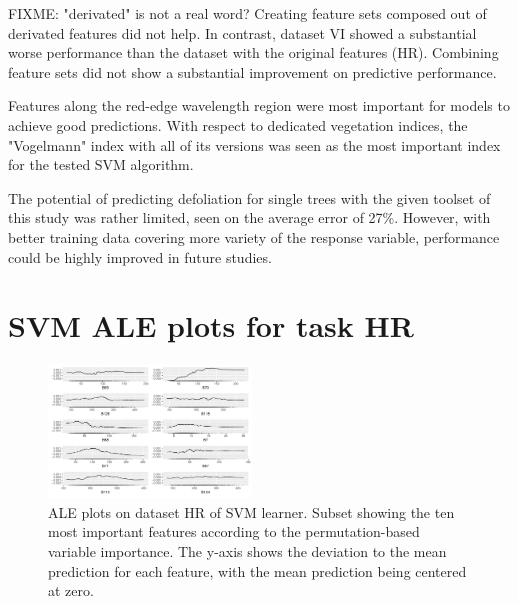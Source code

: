 \documentclass[letterpaper, peerreview]{IEEEtran}
\begin{document}
FIXME: "derivated" is not a real word?
Creating feature sets composed out of derivated features did not help.
In contrast, dataset VI showed a substantial worse performance than the dataset with the original features (HR).
Combining feature sets did not show a substantial improvement on predictive performance.

Features along the red-edge wavelength region were most important for models to achieve good predictions.
With respect to dedicated vegetation indices, the "Vogelmann" index with all of its versions was seen as the most important index for the tested SVM algorithm.

The potential of predicting defoliation for single trees with the given toolset of this study was rather limited, seen on the average error of 27\%. 
However, with better training data covering more variety of the response variable, performance could be highly improved in future studies.

\appendices{}

\section{SVM ALE plots for task HR}

\begin{figure} [ht]
	\begin{center}
		\includegraphics[width=0.48\textwidth] {fi-hr-ale-1.pdf}
		\caption{ALE plots on dataset HR of SVM learner. Subset showing the ten most important features according to the permutation-based variable importance. The y-axis shows the deviation to the mean prediction for each feature, with the mean prediction being centered at zero.}\label{fig:fi-hr-ale}
	\end{center}
\end{figure}
\end{document}
